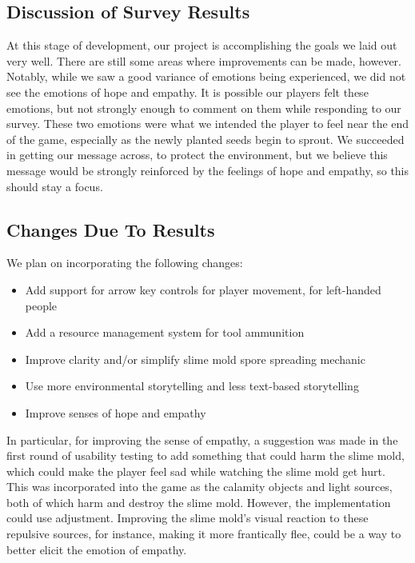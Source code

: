 \documentclass[12pt, titlepage]{article}
\begin{document}
\subsection{Discussion of Survey Results}
At this stage of development, our project is accomplishing the goals we laid out very well.
There are still some areas where improvements can be made, however. Notably, while we saw 
a good variance of emotions being experienced, we did not see the emotions of hope and 
empathy. It is possible our players felt these emotions, but not strongly enough to 
comment on them while responding to our survey. These two emotions were what we intended 
the player to feel near the end of the game, especially as the newly planted seeds begin 
to sprout. We succeeded in getting our message across, to protect the environment, but 
we believe this message would be strongly reinforced by the feelings of hope and empathy, 
so this should stay a focus.

\newpage
\subsection{Changes Due To Results}
We plan on incorporating the following changes:
\begin{itemize}
    \item Add support for arrow key controls for player movement, for left-handed people
    \item Add a resource management system for tool ammunition
    \item Improve clarity and/or simplify slime mold spore spreading mechanic
    \item Use more environmental storytelling and less text-based storytelling
    \item Improve senses of hope and empathy
\end{itemize}

In particular, for improving the sense of empathy, a suggestion was made in the first 
round of usability testing to add something that could harm the slime mold, which could 
make the player feel sad while watching the slime mold get hurt. This was incorporated 
into the game as the calamity objects and light sources, both of which harm and destroy 
the slime mold. However, the implementation could use adjustment. Improving the slime mold's 
visual reaction to these repulsive sources, for instance, making it more frantically flee,
could be a way to better elicit the emotion of empathy.
\end{document}
